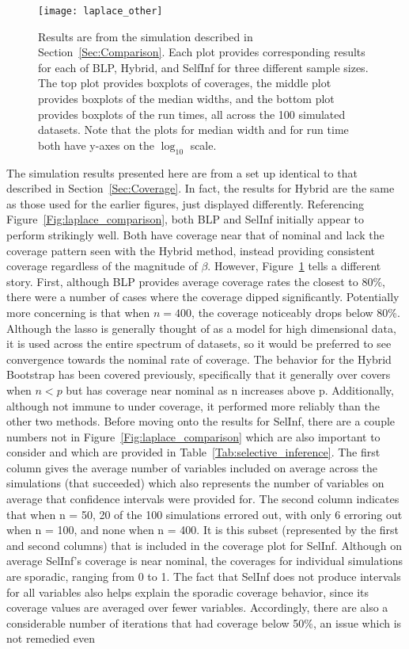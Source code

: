 \begin{figure}[hbtp]
  \begin{center}
  \texttt{[image: laplace\_other]}
  \caption{\label{Fig:laplace_other} Results are from the simulation described in Section~\ref{Sec:Comparison}. Each plot provides corresponding results for each of BLP, Hybrid, and SelfInf for three different sample sizes. The top plot provides boxplots of coverages, the middle plot provides boxplots of the median widths, and the bottom plot provides boxplots of the run times, all across the 100 simulated datasets. Note that the plots for median width and for run time both have y-axes on the $\log_{10}$ scale.}
  \end{center}
\end{figure}

The simulation results presented here are from a set up identical to that described in Section~\ref{Sec:Coverage}. In fact, the results for Hybrid are the same as those used for the earlier figures, just displayed differently. Referencing Figure~\ref{Fig:laplace_comparison}, both BLP and SelInf initially appear to perform strikingly well. Both have coverage near that of nominal and lack the coverage pattern seen with the Hybrid method, instead providing consistent coverage regardless of the magnitude of $\beta$. However, Figure~\ref{Fig:laplace_other} tells a different story. First, although BLP provides average coverage rates the closest to $80\%$, there were a number of cases where the coverage dipped significantly. Potentially more concerning is that when $n = 400$, the coverage noticeably drops below 80\%. Although the lasso is generally thought of as a model for high dimensional data, it is used across the entire spectrum of datasets, so it would be preferred to see convergence towards the nominal rate of coverage. The behavior for the Hybrid Bootstrap has been covered previously, specifically that it generally over covers when $n < p$ but has coverage near nominal as n increases above p. Additionally, although not immune to under coverage, it performed more reliably than the other two methods. Before moving onto the results for SelInf, there are a couple numbers not in Figure~\ref{Fig:laplace_comparison} which are also important to consider and which are provided in Table~\ref{Tab:selective_inference}. The first column gives the average number of variables included on average across the simulations (that succeeded) which also represents the number of variables on average that confidence intervals were provided for. The second column indicates that when n = 50, 20 of the 100 simulations errored out, with only 6 erroring out when n = 100, and none when n = 400. It is this subset (represented by the first and second columns) that is included in the coverage plot for SelInf. Although on average SelInf's coverage is near nominal, the coverages for individual simulations are sporadic, ranging from 0 to 1. The fact that SelInf does not produce intervals for all variables also helps explain the sporadic coverage behavior, since its coverage values are averaged over fewer variables. Accordingly, there are also a considerable number of iterations that had coverage below 50\%, an issue which is not remedied even 